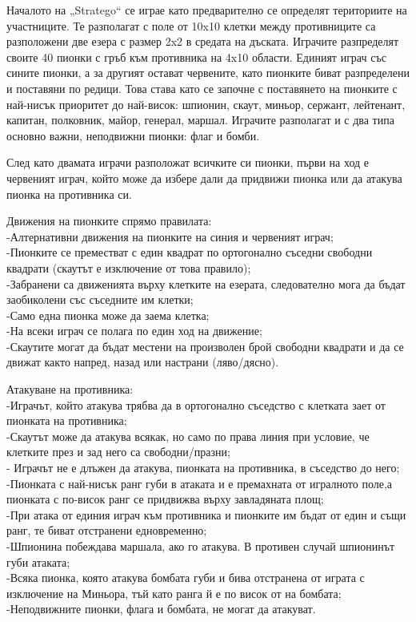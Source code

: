 Началото на „Stratego“ се играе като предварително се определят териториите на участниците. Те разполагат с поле от 10x10 клетки между противниците са разположени две езера с размер 2x2 в средата на дъската. Играчите разпределят своите 40 пионки с гръб към противника на 4x10 области. Единият играч със сините пионки, а за другият остават червените, като пионките биват разпределени и поставяни по редици. Това става като се започне с поставянето на пионките с най-нисък приоритет до най-висок: шпионин, скаут, миньор, сержант, лейтенант, капитан, полковник, майор, генерал, маршал. Играчите разполагат и с два типа основно важни, неподвижни пионки: флаг и бомби.

След като двамата играчи разположат всичките си пионки, първи на ход е червеният играч, който може да избере дали да придвижи пионка или да атакува пионка на противника си.

Движения на пионките спрямо правилата: \\
-Алтернативни движения на пионките на синия и червеният играч; \\
-Пионките се преместват с един квадрат по ортогонално съседни свободни квадрати (скаутът е изключение от това правило); \\
-Забранени са движенията върху клетките на езерата, следователно мога да бъдат заобиколени със съседните им клетки; \\
-Само една пионка може да заема клетка; \\
-На всеки играч се полага по един ход на движение; \\
-Скаутите могат да бъдат местени на произволен брой свободни квадрати и да се движат както напред, назад или настрани (ляво/дясно).

Атакуване на противника: \\
-Играчът, който атакува трябва да в ортогонално съседство с клетката зает от пионката на противника; \\
-Скаутът може да атакува всякак, но само по права линия  при условие, че клетките през и зад него са свободни/празни; \\
- Играчът не е длъжен да атакува, пионката на противника, в съседство до него; \\
-Пионката с най-нисък ранг губи в атаката и е премахната от игралното поле,а пионката с по-висок ранг се придвижва върху завладяната площ; \\
-При атака от единия играч към противника и пионките им бъдат от един и същи ранг, те биват отстранени едновременно; \\
-Шпионина побеждава маршала, ако го атакува. В противен случай шпионинът губи атаката; \\
-Всяка пионка, която атакува бомбата губи и бива отстранена от играта с изключение на Миньора, тъй като ранга й е по висок от на бомбата; \\
-Неподвижните пионки, флага и бомбата, не могат да атакуват.

